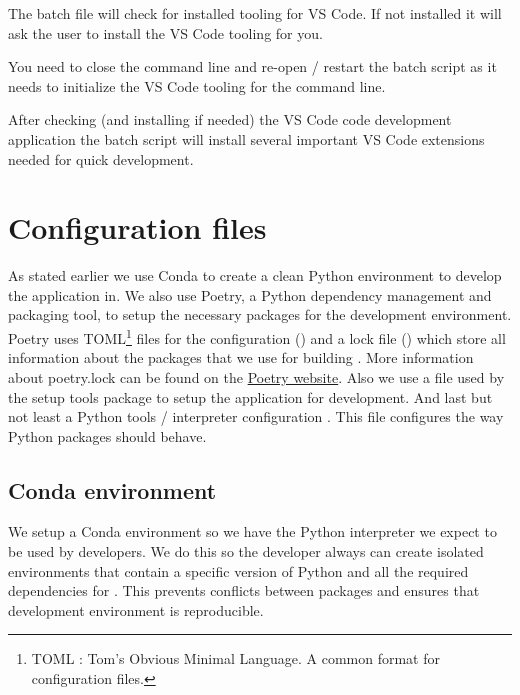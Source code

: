 The batch file will check for installed tooling for VS Code.
If not installed it will ask the user to install the VS Code tooling for you. 

\begin{Note}
You need to close the command line and re-open / restart the batch script as it needs to initialize the VS Code tooling for the command line.
\end{Note}

After checking (and installing if needed) the VS Code code development application the batch script will install several important VS Code extensions needed for quick development.

\section{Configuration files}
As stated earlier we use Conda to create a clean Python environment to develop the \dfastmi application in.
We also use Poetry, a Python dependency management and packaging tool, to setup the necessary packages for the development environment.
Poetry uses TOML\footnote{TOML : Tom's Obvious Minimal Language. A common format for configuration files.} files for the configuration () and a lock file () which store all information about the packages that we use for building \dfastmi.
More information about poetry.lock can be found on the \href{https://python-poetry.org/docs/basic-usage/#installing-without-poetrylock}{Poetry website}.
Also we use a  file used by the setup tools package to setup the application for development.
And last but not least a Python tools / interpreter configuration .
This file configures the way Python packages should behave.

\subsection{Conda environment}
We setup a Conda environment so we have the Python interpreter we expect to be used by developers.
We do this so the developer always can create isolated environments that contain a specific version of Python and all the required dependencies for \dfmi.
This prevents conflicts between packages and ensures that \dfmi development environment is reproducible.

